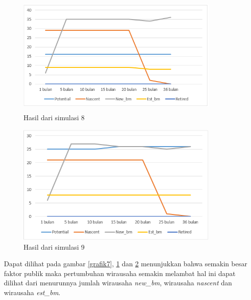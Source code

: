 	\begin{figure} [H]
	\centering  
	\includegraphics[width=10cm, height=6cm]{grafik8} 
		\caption[Hasil dari simulasi]{Hasil dari simulasi 8}
	\label{grafik8} 
\end{figure}

	\begin{figure} [H]
	\centering  
	\includegraphics[width=10cm, height=6cm]{grafik9} 
		\caption[Hasil dari simulasi]{Hasil dari simulasi 9}
	\label{grafik9} 
\end{figure}

Dapat dilihat pada gambar \ref{grafik7}, \ref{grafik8} dan \ref{grafik9} menunjukkan bahwa semakin besar faktor publik maka pertumbuhan wirausaha semakin melambat hal ini dapat dilihat dari menurunnya jumlah wirausaha \textit{new\_bm}, wirausaha \textit{nascent} dan wirausaha \textit{est\_bm}.
